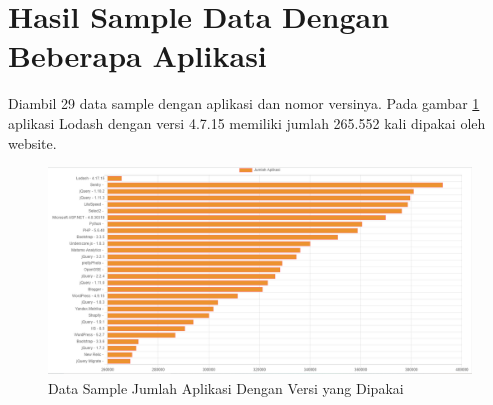 \section{Hasil Sample Data Dengan Beberapa Aplikasi}
Diambil 29 data sample dengan aplikasi dan nomor versinya. Pada gambar \ref{fig:data_sample_res} aplikasi Lodash dengan versi 4.7.15 memiliki jumlah 265.552 kali dipakai oleh website.
\begin{figure}[H]
\centering  
\includegraphics[scale=0.5]{Gambar/hasil_chart_all.PNG}  
\caption{Data Sample Jumlah Aplikasi Dengan Versi yang Dipakai} 
\label{fig:data_sample_res} 
\end{figure}